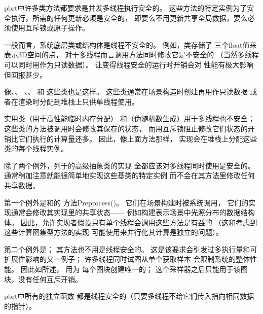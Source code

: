 pbrt中许多类方法都要求是并发多线程执行安全的。
这些方法的特定实例为了安全执行，所需的任何更新必须是安全的，
即要么不用更新共享全局数据，要么必须使用互斥锁或原子操作。

一般而言，系统底层类或结构体是线程不安全的。
例如，类存储了
三个{\ttfamily float}值来表示3D空间的点，
对于多线程而言调用方法同时修改它是不安全的
（当然多线程可以同时用作为只读数据）。
让变得线程安全的运行时开销会对
性能有极大影响但回报甚少。

像、、
、、
和
这些类也是这样。
这些类通常在场景构造时创建再用作只读数据
或者在渲染时分配到堆栈上只供单线程使用。

实用类（用于高性能临时内存分配）
和（伪随机数生成）用于多线程也不安全；
这些类的方法被调用时会修改其保存的状态，
而用互斥锁阻止修改它们状态的开销比它们执行的计算量还多。
因此，像上面方法那样，
实现会在堆栈上分配这些类的每个线程实例。

除了两个例外，列于的高级抽象类的实现
全都应该对多线程同时使用是安全的。
通常稍加注意就能很简单地实现这些基类的特定实例
而不会在其方法里修改任何共享数据。

第一个例外是和的
方法{\ttfamily Preprocess()}。
它们在场景构建时被系统调用，
它们的实现通常会修改其实现里的共享状态——
例如构建表示场景中光照分布的数据结构体。
因此，允许实现者假设只有单个线程会调用这些方法是有益的
（这和考虑到这些计算密集型方法的实现
可能使用来并行化其计算是独立的问题）。

第二个例外是；
其方法也不用是线程安全的。
这是该要求会引发过多执行量和可扩展性影响的又一例子；
许多线程同时试图从单个获取样本
会限制系统的整体性能。
因此如所述，
用为
每个图块创建唯一的；
这个采样器之后只能用于该图块，没有任何互斥开销。

pbrt中所有的独立函数
都是线程安全的（只要多线程不给它们传入指向相同数据的指针）。